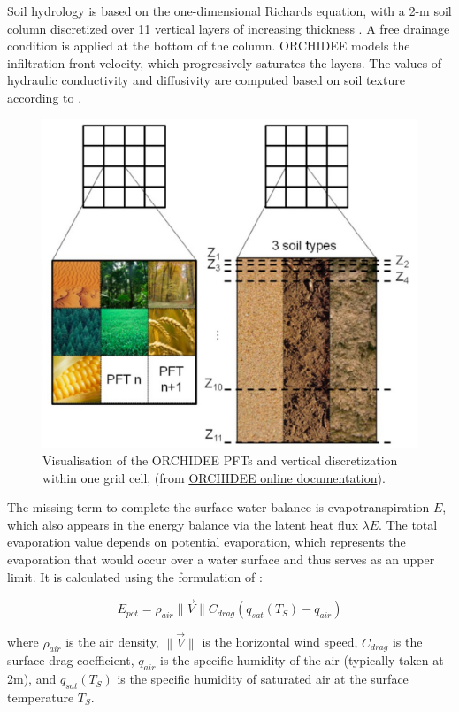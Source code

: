 Soil hydrology is based on the one-dimensional Richards equation, with a 2-m soil column discretized over 11 vertical layers of increasing thickness \citep{de_rosnay_impact_2002, dorgeval_sensitivity_2008}. A free drainage condition is applied at the bottom of the column. ORCHIDEE models the infiltration front velocity, which progressively saturates the layers. The values of hydraulic conductivity and diffusivity are computed based on soil texture according to \citet{mualem_new_1976, van_genuchten_closed-form_1980}.

\begin{figure}[hbtp]
    \centering
    \includegraphics[width=0.5\linewidth]{images/methods/ORC_discretization.png}
    \caption{Visualisation of the ORCHIDEE PFTs and vertical discretization within one grid cell, (from \href{https://orchidee.ipsl.fr/introduction/}{ORCHIDEE online documentation}).}
    \label{fig:ORC_discretization}
\end{figure}

The missing term to complete the surface water balance is evapotranspiration $E$, which also appears in the energy balance via the latent heat flux $\lambda E$. The total evaporation value depends on potential evaporation, which represents the evaporation that would occur over a water surface and thus serves as an upper limit. It is calculated using the formulation of \citet{Budyko_1956}:  

\begin{equation}
    E_{pot} = \rho_{air}  \lVert \vec{V} \rVert C_{drag} (q_{sat}(T_S) - q_{air})
\end{equation}

where $\rho_{air}$ is the air density, $\lVert \vec{V} \rVert$ is the horizontal wind speed, $C_{drag}$ is the surface drag coefficient, $q_{air}$ is the specific humidity of the air (typically taken at 2m), and $q_{sat}(T_S)$ is the specific humidity of saturated air at the surface temperature $T_S$.

